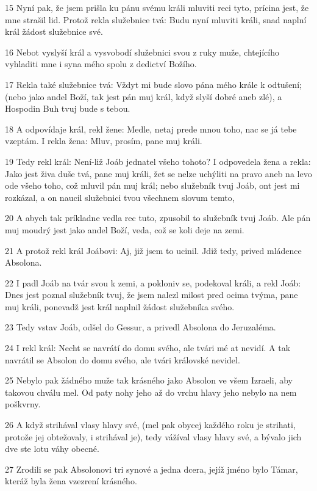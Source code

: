 \par 15 Nyní pak, že jsem prišla ku pánu svému králi mluviti reci tyto, prícina jest, že mne strašil lid. Protož rekla služebnice tvá: Budu nyní mluviti králi, snad naplní král žádost služebnice své.
\par 16 Nebot vyslyší král a vysvobodí služebnici svou z ruky muže, chtejícího vyhladiti mne i syna mého spolu z dedictví Božího.
\par 17 Rekla také služebnice tvá: Vždyt mi bude slovo pána mého krále k odtušení; (nebo jako andel Boží, tak jest pán muj král, když slyší dobré aneb zlé), a Hospodin Buh tvuj bude s tebou.
\par 18 A odpovídaje král, rekl žene: Medle, netaj prede mnou toho, nac se já tebe vzeptám. I rekla žena: Mluv, prosím, pane muj králi.
\par 19 Tedy rekl král: Není-liž Joáb jednatel všeho tohoto? I odpovedela žena a rekla: Jako jest živa duše tvá, pane muj králi, žet se nelze uchýliti na pravo aneb na levo ode všeho toho, což mluvil pán muj král; nebo služebník tvuj Joáb, ont jest mi rozkázal, a on naucil služebnici tvou všechnem slovum temto,
\par 20 A abych tak príkladne vedla rec tuto, zpusobil to služebník tvuj Joáb. Ale pán muj moudrý jest jako andel Boží, veda, což se koli deje na zemi.
\par 21 A protož rekl král Joábovi: Aj, již jsem to ucinil. Jdiž tedy, prived mládence Absolona.
\par 22 I padl Joáb na tvár svou k zemi, a pokloniv se, podekoval králi, a rekl Joáb: Dnes jest poznal služebník tvuj, že jsem nalezl milost pred ocima tvýma, pane muj králi, ponevadž jest král naplnil žádost služebníka svého.
\par 23 Tedy vstav Joáb, odšel do Gessur, a privedl Absolona do Jeruzaléma.
\par 24 I rekl král: Necht se navrátí do domu svého, ale tvári mé at nevidí. A tak navrátil se Absolon do domu svého, ale tvári královské nevidel.
\par 25 Nebylo pak žádného muže tak krásného jako Absolon ve všem Izraeli, aby takovou chválu mel. Od paty nohy jeho až do vrchu hlavy jeho nebylo na nem poškvrny.
\par 26 A když strihával vlasy hlavy své, (mel pak obycej každého roku je strihati, protože jej obtežovaly, i strihával je), tedy vážíval vlasy hlavy své, a bývalo jich dve ste lotu váhy obecné.
\par 27 Zrodili se pak Absolonovi tri synové a jedna dcera, jejíž jméno bylo Támar, kteráž byla žena vzezrení krásného.
